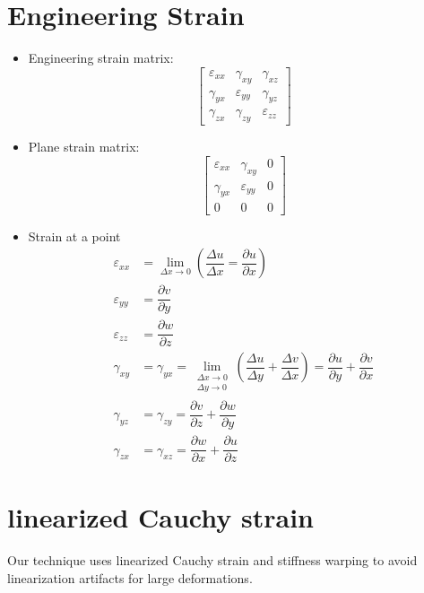\section{Engineering Strain}
\begin{itemize}
\item Engineering strain matrix:
\begin{equation*}
\begin{bmatrix}
\varepsilon_{xx} & \gamma_{xy} & \gamma_{xz} \\
\gamma_{yx} & \varepsilon_{yy} & \gamma_{yz} \\
\gamma_{zx} & \gamma_{zy} & \varepsilon_{zz}
\end{bmatrix}
\end{equation*}
\item Plane strain matrix:
\begin{equation*}
\begin{bmatrix}
\varepsilon_{xx} & \gamma_{xy} & 0 \\
\gamma_{yx} & \varepsilon_{yy} & 0 \\
0 & 0 & 0
\end{bmatrix}
\end{equation*}
\item Strain at a point
\begin{align*}
\varepsilon_{xx} &= \lim_{\Delta x \to 0} \left( \dfrac{\Delta u}{\Delta x} = \dfrac{\partial u}{\partial x}\right)\\
\varepsilon_{yy} &= \dfrac{\partial v}{\partial y} \\
\varepsilon_{zz} &= \dfrac{\partial w}{\partial z} \\
\gamma_{xy} &= \gamma_{yx} = \lim_{\substack{\Delta x\to 0 \\ \Delta y\to 0}} \left( \dfrac{\Delta u}{\Delta y}+\dfrac{\Delta v}{\Delta x}\right) = \dfrac{\partial u}{\partial y} + \dfrac{\partial v}{\partial x} \\
\gamma_{yz} &= \gamma_{zy} = \dfrac{\partial v}{\partial z} + \dfrac{\partial w}{\partial y} \\
\gamma_{zx} &= \gamma_{xz} = \dfrac{\partial w}{\partial x} + \dfrac{\partial u}{\partial z}
\end{align*}
\end{itemize}

\section{linearized Cauchy strain}
Our technique uses linearized Cauchy strain and stiffness warping to avoid linearization artifacts for large deformations.

